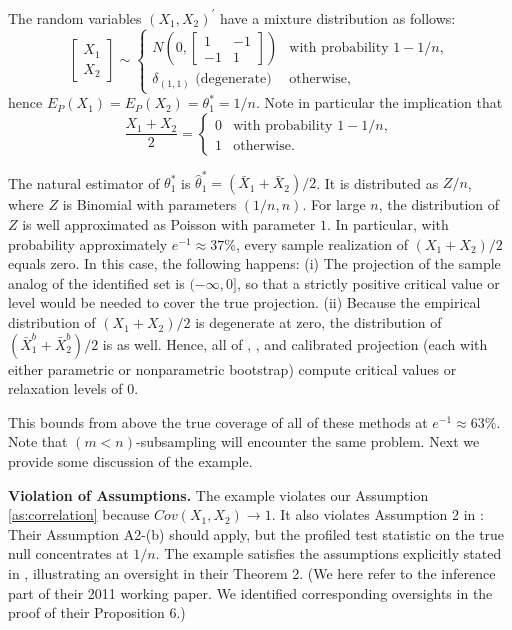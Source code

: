 \documentclass[letterpaper,11pt]{article}
\theoremstyle{myplain}
\theoremstyle{mydefinition}
\theoremstyle{myremark}
\renewcommand{\cite}{\citet}
\numberwithin{equation}{section}
\numberwithin{figure}{section}
\begin{document}
\begin{appendices}
The random variables $(X_1,X_2)^{\prime }$ have a mixture distribution
as follows:
\begin{equation*}
\left[\begin{array}{c} X_1 \\ X_2 \end{array}\right] \sim \left\{\begin{array}{ll}N\left( 0,\left[\begin{array}{cc}1 & -1 \\ -1 & 1 \end{array} \right] \right) & \text{with probability }1-1/n, \\ \delta _{(1,1)}\text{ (degenerate)} & \text{otherwise},\end{array}\right. 
\end{equation*}
hence $E_P(X_1)=E_P(X_2)=\theta_1^*=1/n$. Note in particular the implication that
\begin{equation*}
\frac{X_1+X_2}{2}=\left\{\begin{array}{ll}0 & \text{with probability }1-1/n, \\1 & \text{otherwise}.\end{array}\right. 
\end{equation*}

The natural estimator of $\theta _{1}^{\ast }$ is $\hat{\theta }_{1}^{\ast }=(\bar{X}_{1}+\bar{X}_{2})/2$. It is distributed as $Z/n$, where $Z$ is Binomial with parameters $(1/n,n)$. For large $n$, the distribution of $Z$ is well approximated as Poisson with parameter $1$. In particular, with probability approximately $e^{-1}\approx 37\%$, every sample realization of $(X_1+X_2)/2$ equals zero. In this case, the following happens: (i) The projection of the sample analog of the identified set is $(-\infty ,0]$, so that a strictly positive critical value or level would be needed to cover the true projection. (ii) Because the empirical distribution of $(X_1+X_2)/2$ is degenerate at zero, the distribution of $(\bar{X}_{1}^{b}+\bar{X}_2^b)/2$ is as well. Hence, all of \cite{PakesPorterHo2011}, \cite{BCS14_subv}, and calibrated projection (each with either parametric or nonparametric bootstrap) compute critical values or relaxation levels of $0$.

This bounds from above the true coverage of all of these methods at $e^{-1}\approx 63\%$. Note that $(m<n)$-subsampling will encounter the same problem. Next we provide some discussion of the example.

\noindent\textbf{Violation of Assumptions.}
The example violates our Assumption \ref{as:correlation} because $Cov(X_1,X_2)\rightarrow 1$. It also violates Assumption 2 in \cite{BCS14_subv}: Their Assumption A2-(b) should apply, but the profiled test statistic on the true null concentrates at $1/n$. The example satisfies the assumptions explicitly stated in \cite{PakesPorterHo2011}, illustrating an oversight in their Theorem 2. (We here refer to the inference part of their 2011 working paper. We identified corresponding oversights in the proof of their Proposition 6.)


\end{appendices}
\end{document}

